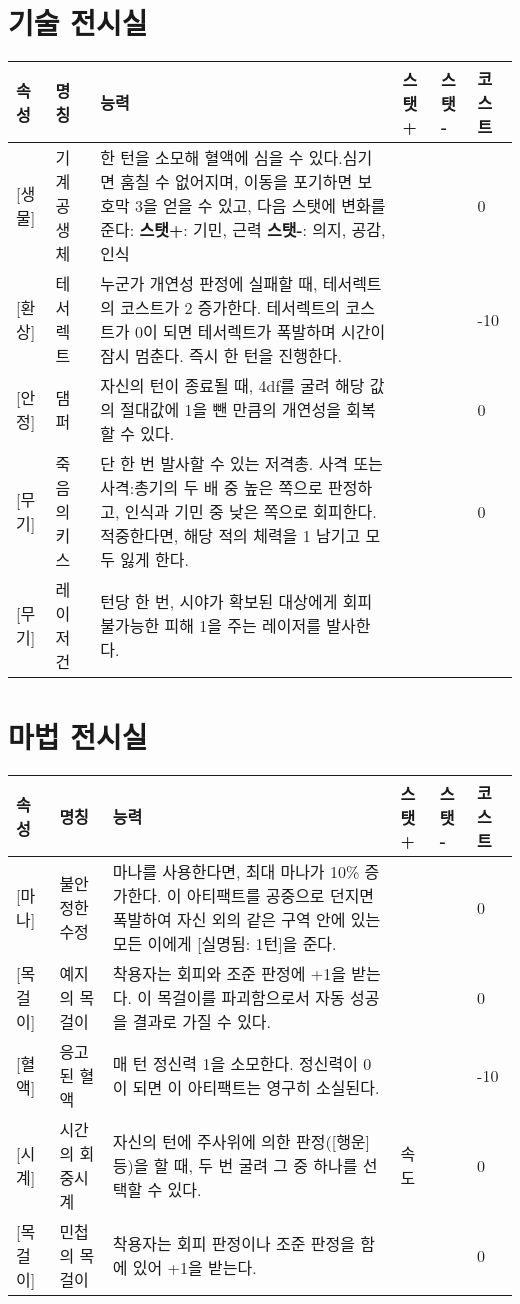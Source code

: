 \documentclass[12pt]{report}
\begin{document}
	\section*{기술 전시실}
		\begin{tabularx}{\textwidth}{l|l|X|l|l|l}
			\textbf{속성} & \textbf{명칭} & \textbf{능력} & \textbf{스탯 +} & \textbf{스탯 -} & \textbf{코스트}\\ \hline \hline
			[기술][생물]& 기계 공생체 & 한 턴을 소모해 혈액에 심을 수 있다.\newline 심기면 훔칠 수 없어지며, 이동을 포기하면 보호막 3을 얻을 수 있고, 다음 스탯에 변화를 준다: \newline \textbf{스탯+}: 기민, 근력 \newline \textbf{스탯-}: 의지, 공감, 인식  &   &     & 0 \\ \hline
			[기술][환상]& 테서렉트 & 누군가 개연성 판정에 실패할 때, 테서렉트의 코스트가 2 증가한다. \newline 테서렉트의 코스트가 0이 되면 테서렉트가 폭발하며 시간이 잠시 멈춘다. 즉시 한 턴을 진행한다. &  &      & -10 \\ \hline
			[기술][안정]& 댐퍼 & 자신의 턴이 종료될 때, 4df를 굴려 해당 값의 절대값에 1을 뺀 만큼의 개연성을 회복할 수 있다.  &  &      & 0 \\ \hline
			[기술][무기]& 죽음의 키스 & 단 한 번 발사할 수 있는 저격총. 사격 또는 사격:총기의 두 배 중 높은 쪽으로 판정하고, 인식과 기민 중 낮은 쪽으로 회피한다. 적중한다면, 해당 적의 체력을 1 남기고 모두 잃게 한다.  &  &      & 0 \\ \hline
			[기술][무기]& 레이저 건 & 턴당 한 번, 시야가 확보된 대상에게 회피 불가능한 피해 1을 주는 레이저를 발사한다. &  & & \\
		\end{tabularx}
	
	\section*{마법 전시실}
		\begin{tabularx}{\textwidth}{l|l|X|l|l|l}
			\textbf{속성} & \textbf{명칭} & \textbf{능력} & \textbf{스탯 +} & \textbf{스탯 -} & \textbf{코스트} \\ \hline \hline
			[마법][마나]& 불안정한 수정 & 마나를 사용한다면, 최대 마나가 10\% 증가한다. 이 아티팩트를 공중으로 던지면 폭발하여 자신 외의 같은 구역 안에 있는 모든 이에게 [실명됨: 1턴]을 준다. &  & & 0 \\ \hline
			[마법][목걸이]& 예지의 목걸이 & 착용자는 회피와 조준 판정에 +1을 받는다. 이 목걸이를 파괴함으로서 자동 성공을 결과로 가질 수 있다. &  & & 0 \\ \hline
			[흑마법][혈액] & 응고된 혈액 & 매 턴 정신력 1을 소모한다. 정신력이 0이 되면 이 아티팩트는 영구히 소실된다. &  & & -10 \\ \hline
			[마법][시계] & 시간의 회중시계 & 자신의 턴에 주사위에 의한 판정([행운] 등)을 할 때, 두 번 굴려 그 중 하나를 선택할 수 있다.& 속도 & & 0 \\ \hline
			[마법][목걸이]& 민첩의 목걸이 & 착용자는 회피 판정이나 조준 판정을 함에 있어 +1을 받는다. &  & & 0 \\
		\end{tabularx}
	
\end{document}
